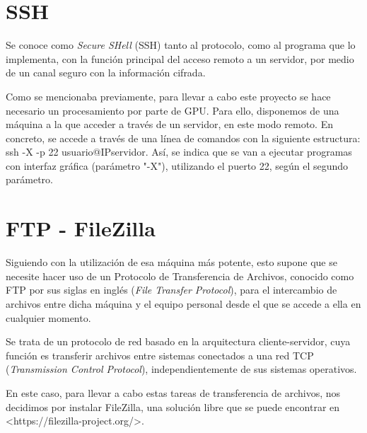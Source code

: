 \section{SSH}

Se conoce como \textit{Secure SHell} (SSH) tanto al protocolo, como al programa que lo implementa, con la función principal del acceso remoto a un servidor, por medio de un canal seguro con la información cifrada. \cite{wiki:ssh}

Como se mencionaba previamente, para llevar a cabo este proyecto se hace necesario un procesamiento por parte de GPU. Para ello, disponemos de una máquina a la que acceder a través de un servidor, en este modo remoto. En concreto, se accede a través de una línea de comandos con la siguiente estructura: ssh -X -p 22 usuario@IPservidor. Así, se indica que se van a ejecutar programas con interfaz gráfica  (parámetro "-X"), utilizando el puerto 22, según el segundo parámetro.


\section{FTP - FileZilla}

Siguiendo con la utilización de esa máquina más potente, esto supone que se necesite hacer uso de un Protocolo de Transferencia de Archivos, conocido como FTP por sus siglas en inglés (\textit{File Transfer Protocol}), para el intercambio de archivos entre dicha máquina y el equipo personal desde el que se accede a ella en cualquier momento.

Se trata de un protocolo de red basado en la arquitectura cliente-servidor, cuya función es transferir archivos entre sistemas conectados a una red TCP (\textit{Transmission Control Protocol}), independientemente de sus sistemas operativos. \cite{wiki:ftp}

En este caso, para llevar a cabo estas tareas de transferencia de archivos, nos decidimos por instalar FileZilla, una solución libre que se puede encontrar en <https://filezilla-project.org/>.


